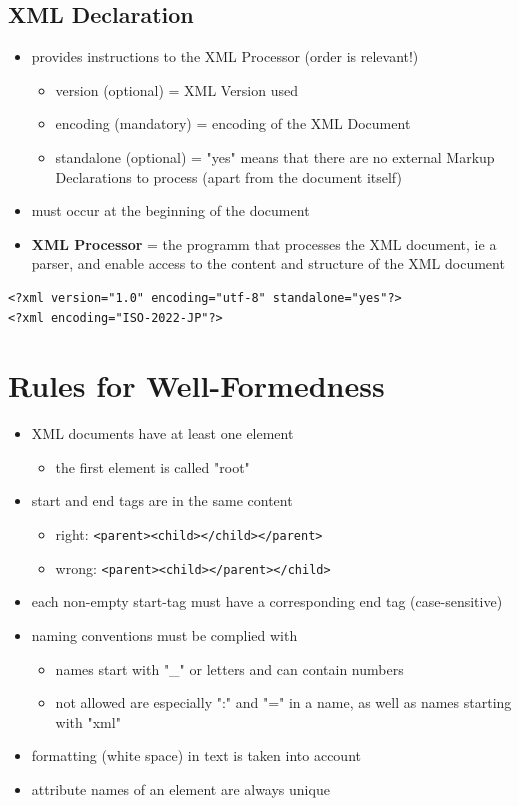 \documentclass[11pt]{article}
\begin{document}
\subsection{XML Declaration}
\label{sec:orgb3148a8}
\begin{itemize}
\item provides instructions to the XML Processor (order is relevant!)
\begin{itemize}
\item version (optional) = XML Version used
\item encoding (mandatory) = encoding of the XML Document
\item standalone (optional) = "yes" means that there are no external Markup Declarations to process (apart from the document itself)
\end{itemize}
\item must occur at the beginning of the document
\item \textbf{XML Processor} = the programm that processes the XML document, ie a parser, and enable access to the content and structure of the XML document
\end{itemize}
\lstset{breaklines=true,language=XML,label= ,caption= ,captionpos=b,numbers=none}
\begin{lstlisting}
<?xml version="1.0" encoding="utf-8" standalone="yes"?>
<?xml encoding="ISO-2022-JP"?>
\end{lstlisting}
\section{Rules for Well-Formedness}
\label{sec:org5d20b97}
\begin{itemize}
\item XML documents have at least one element
\begin{itemize}
\item the first element is called "root"
\end{itemize}
\item start and end tags are in the same content
\begin{itemize}
\item right: \texttt{<parent><child></child></parent>}
\item wrong: \texttt{<parent><child></parent></child>}
\end{itemize}
\item each non-empty start-tag must have a corresponding end tag (case-sensitive)
\item naming conventions must be complied with
\begin{itemize}
\item names start with "\_" or letters and can contain numbers
\item not allowed are especially ":" and "=" in a name, as well as names starting with "xml"
\end{itemize}
\item formatting (white space) in text is taken into account
\item attribute names of an element are always unique
\end{itemize}
\end{document}
